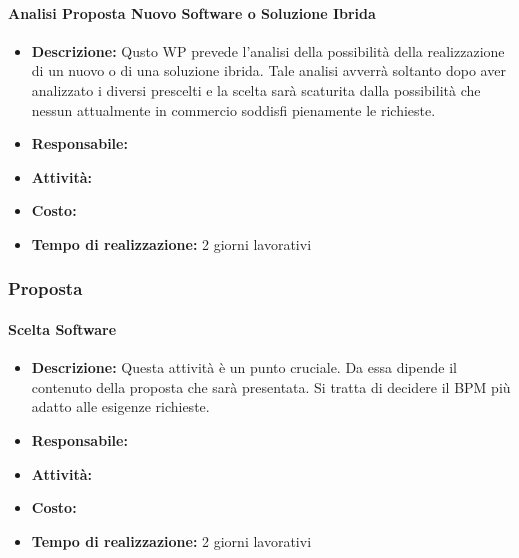 \paragraph{Analisi Proposta Nuovo Software o Soluzione Ibrida }
\begin{itemize}
\item{\bfseries Descrizione:} Qusto WP prevede l'analisi della possibilità della realizzazione di un nuovo  o di una soluzione ibrida. Tale analisi avverrà soltanto dopo aver analizzato i diversi  prescelti e la scelta sarà scaturita dalla possibilità che nessun  attualmente in commercio soddisfi pienamente le richieste.
\item {\bfseries Responsabile:}
\item  {\bfseries Attività:}
\item  {\bfseries Costo:}
\item  {\bfseries Tempo di realizzazione:} 2 giorni lavorativi
\end{itemize}




\subsubsection{Proposta}


\paragraph{Scelta Software }
\begin{itemize}
\item{\bfseries Descrizione:} Questa attività è un punto cruciale. Da essa dipende il contenuto della proposta che sarà presentata. Si tratta di decidere il  BPM più adatto alle esigenze richieste.
\item {\bfseries Responsabile:}
\item  {\bfseries Attività:}
\item  {\bfseries Costo:}
\item  {\bfseries Tempo di realizzazione:} 2 giorni lavorativi
\end{itemize}

